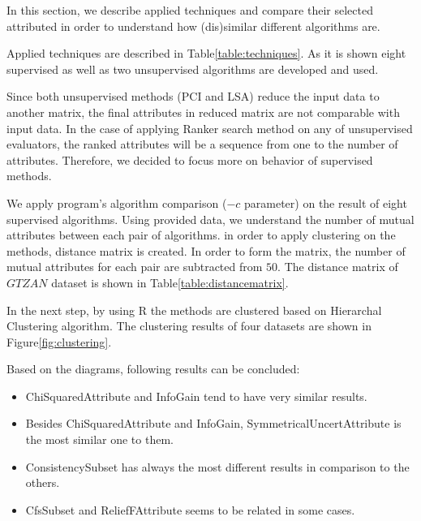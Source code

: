 In this section, we describe applied techniques and compare their selected attributed in order to understand how (dis)similar different algorithms are.

Applied techniques are described in Table\ref{table:techniques}. As it is shown eight supervised as well as two unsupervised algorithms are developed and used.

Since both unsupervised methods (PCI and LSA) reduce the input data to another matrix, the final attributes in reduced
matrix are not comparable with input data. In the case of applying Ranker search method on any of unsupervised evaluators, the ranked attributes will be a sequence from one to the number of attributes. Therefore, we decided to focus more on behavior of supervised methods.

We apply program's algorithm comparison ($-c$ parameter) on the result of eight supervised algorithms. Using provided data, we understand the number of mutual attributes between each pair of algorithms. in order to apply clustering on the methods, distance matrix is created. In order to form the matrix, the number of mutual attributes for each pair are subtracted from $50$. The distance matrix of $GTZAN$ dataset is shown in Table\ref{table:distancematrix}.

In the next step, by using R the methods are clustered based on Hierarchal Clustering algorithm. The clustering results of four datasets are shown in Figure\ref{fig:clustering}.

Based on the diagrams, following results can be concluded:
\begin{itemize}
\item ChiSquaredAttribute and InfoGain tend to have very similar results.
\item Besides ChiSquaredAttribute and InfoGain, SymmetricalUncertAttribute is the most similar one to them.
\item ConsistencySubset has always the most different results in comparison to the others.
\item CfsSubset and ReliefFAttribute seems to be related in some cases.
\end{itemize}

